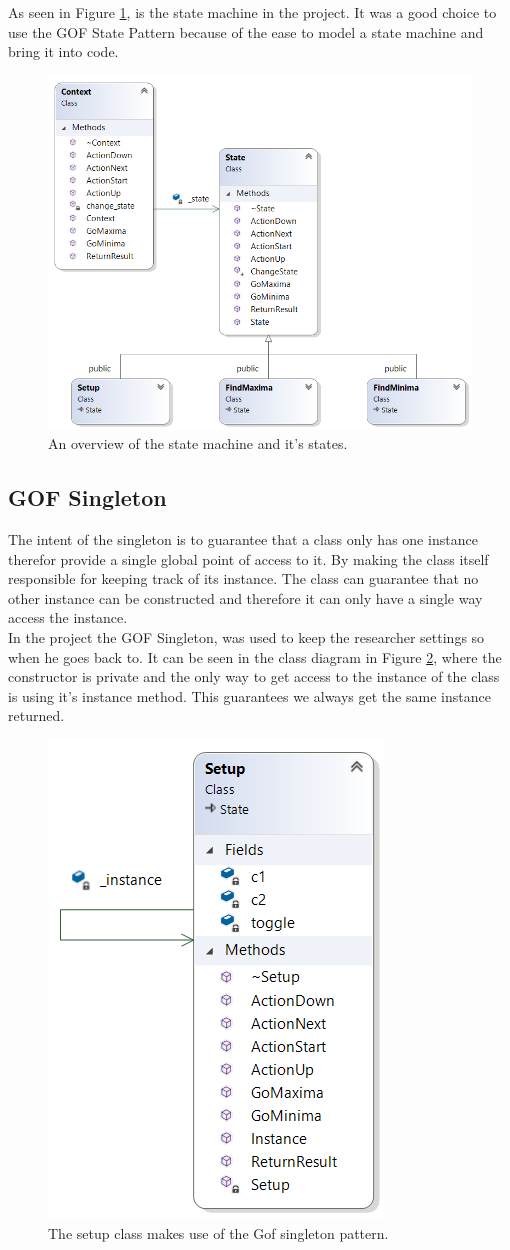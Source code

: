 As seen in Figure \ref{fig:statemachine}, is the state machine in the project. It was a good choice to use the GOF State Pattern because of the ease to model a state machine and bring it into code. 

\begin{figure}[h]
	\centering
	\includegraphics[width=0.7\linewidth]{diagram/StateMachine}
	\caption{An overview of the state machine and it's states.}
	\label{fig:statemachine}
\end{figure}

\subsection{GOF Singleton}\label{dp:singleton}
The intent of the singleton is to guarantee that a class only has one instance therefor provide a single global point of access to it. By making the class itself responsible for keeping track of its instance. The class can guarantee that no other instance can be constructed and therefore it can only have a single way access the instance.
\\
In the project the GOF Singleton, was used to keep the researcher settings so when he goes back to. It can be seen in the class diagram in Figure \ref{fig:singleton}, where the constructor is private and the only way to get access to the instance of the class is using it's instance method. This guarantees we always get the same instance returned.

\begin{figure}[h]
	\centering
	\includegraphics[width=0.4\linewidth]{diagram/singleton}
	\caption[Gof Singleton]{The setup class makes use of the Gof singleton pattern. }
	\label{fig:singleton}
\end{figure}

